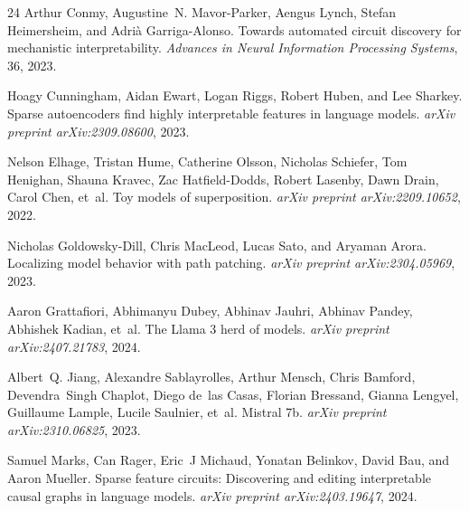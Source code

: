 \documentclass[11pt]{article}
\begin{document}
\begin{thebibliography}{24}
Arthur Conmy, Augustine~N. Mavor-Parker, Aengus Lynch, Stefan Heimersheim, and
  Adri{\`a} Garriga-Alonso.
\newblock Towards automated circuit discovery for mechanistic interpretability.
\newblock \emph{Advances in Neural Information Processing Systems}, 36, 2023.

Hoagy Cunningham, Aidan Ewart, Logan Riggs, Robert Huben, and Lee Sharkey.
\newblock Sparse autoencoders find highly interpretable features in language
  models.
\newblock \emph{arXiv preprint arXiv:2309.08600}, 2023.

Nelson Elhage, Tristan Hume, Catherine Olsson, Nicholas Schiefer, Tom Henighan,
  Shauna Kravec, Zac Hatfield-Dodds, Robert Lasenby, Dawn Drain, Carol Chen,
  et~al.
\newblock Toy models of superposition.
\newblock \emph{arXiv preprint arXiv:2209.10652}, 2022.

Nicholas Goldowsky-Dill, Chris MacLeod, Lucas Sato, and Aryaman Arora.
\newblock Localizing model behavior with path patching.
\newblock \emph{arXiv preprint arXiv:2304.05969}, 2023.

Aaron Grattafiori, Abhimanyu Dubey, Abhinav Jauhri, Abhinav Pandey, Abhishek
  Kadian, et~al.
\newblock The {Llama} 3 herd of models.
\newblock \emph{arXiv preprint arXiv:2407.21783}, 2024.

Albert~Q. Jiang, Alexandre Sablayrolles, Arthur Mensch, Chris Bamford,
  Devendra~Singh Chaplot, Diego de~las Casas, Florian Bressand, Gianna Lengyel,
  Guillaume Lample, Lucile Saulnier, et~al.
\newblock Mistral 7b.
\newblock \emph{arXiv preprint arXiv:2310.06825}, 2023.

Samuel Marks, Can Rager, Eric~J Michaud, Yonatan Belinkov, David Bau, and Aaron
  Mueller.
\newblock Sparse feature circuits: Discovering and editing interpretable causal
  graphs in language models.
\newblock \emph{arXiv preprint arXiv:2403.19647}, 2024.


\end{thebibliography}
\end{document}
